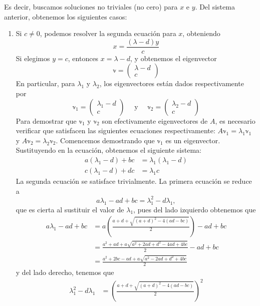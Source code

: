 Es decir, buscamos soluciones no triviales (no cero) para $x$ e $y$. Del sistema anterior, obtenemos los siguientes casos:
\begin{enumerate}[label=\roman*)]
    \item Si $c \neq 0$, podemos resolver la segunda ecuación para $x$, obteniendo
    $$x = \frac{( \lambda - d )y}{c}$$
    Si elegimos $y = c$, entonces $x = \lambda - d$, y obtenemos el eigenvector
    $$\mathbb{v} = \begin{pmatrix} \lambda - d \\ c \end{pmatrix}$$
    En particular, para $\lambda_1$ y $\lambda_2$, los eigenvectores están dados respectivamente por
    $$\mathbb{v}_1 = \begin{pmatrix} \lambda_1 - d \\ c \end{pmatrix} \quad \text{ y } \quad \mathbb{v}_2 = \begin{pmatrix} \lambda_2 - d \\ c \end{pmatrix}$$\newpage
    Para demostrar que $\mathbb{v}_1$ y $\mathbb{v}_2$ son efectivamente eigenvectores de $A$, es necesario verificar que satisfacen las siguientes ecuaciones respectivamente: $A\mathbb{v}_1 = \lambda_1\mathbb{v}_1$ y $A\mathbb{v}_2 = \lambda_2\mathbb{v}_2$. Comencemos demostrando que $\mathbb{v}_1$ es un eigenvector. Sustituyendo en la ecuación, obtenemos el siguiente sistema:
    \begin{align*}
        a(\lambda_1 - d) + bc & = \lambda_1 (\lambda_1 - d) \\
        c(\lambda_1 - d) + dc & = \lambda_1 c
    \end{align*}
    La segunda ecuación se satisface trivialmente. La primera ecuación se reduce a
    $$a\lambda_1 - ad + bc = \lambda_1^2 - d\lambda_1,$$
    que es cierta al sustituir el valor de $\lambda_1$, pues del lado izquierdo obtenemos que
    \begin{align*}
        a\lambda_1 - ad + bc & = a \left( \frac{a + d + \sqrt{(a + d)^2 - 4(ad - bc)}}{2} \right) - ad + bc \\
        & = \frac{a^2 + ad + a\sqrt{a^2 + 2ad + d^2 - 4ad + 4bc}}{2} - ad + bc \\
        & = \frac{a^2 + 2bc - ad + a\sqrt{a^2 - 2ad + d^2 + 4bc}}{2}
    \end{align*}
    y del lado derecho, tenemos que
    \begin{align*}
        \lambda_1^2 - d\lambda_1 & = \left( \frac{a + d + \sqrt{(a + d)^2 - 4(ad - bc)}}{2} \right)^2 \\

\end{align*}
\end{enumerate}
